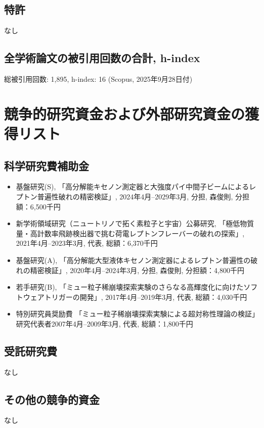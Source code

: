 \subsection{特許}
\vspace{-3mm}
なし
\vspace{-4mm}

\subsection{全学術論文の被引用回数の合計, h-index}
\noindent
総被引用回数: 1,895, h-index: 16 (Scopus, 2025年9月28日付)

\newpage



\section{競争的研究資金および外部研究資金の獲得リスト}
\subsection{科学研究費補助金}
\begin{itemize}
  \setlength{\parskip}{0cm} %
  \setlength{\itemsep}{0cm} %
\item 基盤研究(S), 「高分解能キセノン測定器と大強度パイ中間子ビームによるレプトン普遍性破れの精密検証」, 2024年4月--2029年3月, 分担, 森俊則, 分担額：6,500千円
\item 新学術領域研究（ニュートリノで拓く素粒子と宇宙）公募研究, 「極低物質量・高計数率飛跡検出器で挑む荷電レプトンフレーバーの破れの探索」, 2021年4月--2023年3月, 代表, 総額：6,370千円
\item 基盤研究(A), 「高分解能大型液体キセノン測定器によるレプトン普遍性の破れの精密検証」, 2020年4月--2024年3月, 分担, 森俊則, 分担額：4,800千円
\item 若手研究(B),  「ミュー粒子稀崩壊探索実験のさらなる高輝度化に向けたソフトウェアトリガーの開発」, 2017年4月--2019年3月, 代表, 総額：4,030千円
\item 特別研究員奨励費 「ミュー粒子稀崩壊探索実験による超対称性理論の検証」研究代表者2007年4月--2009年3月, 代表, 総額：1,800千円
\end{itemize}

\subsection{受託研究費}
なし
\subsection{その他の競争的資金}
なし
